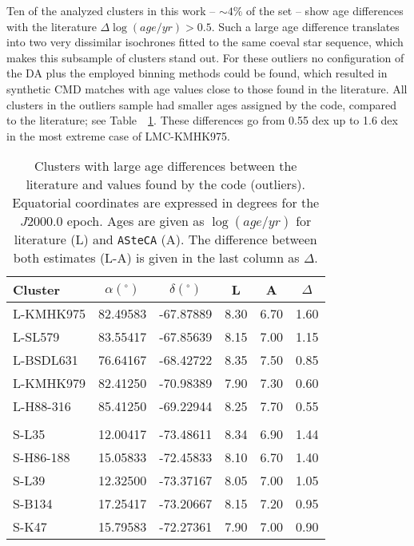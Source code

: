 \documentclass{aa}
\begin{document}
\begin{appendix}
Ten of the analyzed clusters in this work -- ${\sim}4\%$ of the set -- show age
differences with the literature $\Delta\log(age/yr){>}0.5$.
Such a large age difference translates into two very dissimilar isochrones
fitted to the same coeval star sequence, which makes this subsample of
clusters stand out.
%
For these outliers no configuration of the DA plus the employed binning
methods could be found, which resulted in synthetic CMD matches with age values
close to those found in the literature.
%
All clusters in the outliers sample had smaller ages assigned by the code,
compared to the literature; see Table~~\ref{tab:outliers}. These
differences go from 0.55 dex up to 1.6 dex in the most extreme case of
LMC-KMHK975.

\begin{table}
\centering
\caption{Clusters with large age differences between the literature
and values found by the code (outliers).
Equatorial coordinates are expressed in degrees for the $J2000.0$ epoch.
Ages are given as $\log(age/yr)$ for literature (L) and \texttt{ASteCA} (A).
The difference between both estimates (L-A) is given in the last column as
$\Delta$.}
\label{tab:outliers}
\begin{tabular}{lccccc}
\hline\hline
Cluster & $\alpha(^\circ)$ & $\delta(^\circ)$ & L & A & $\Delta$\\
\hline
L-KMHK975 & 82.49583 & -67.87889 & 8.30 & 6.70 & 1.60\\
L-SL579 & 83.55417 & -67.85639 & 8.15 & 7.00 & 1.15\\
L-BSDL631 & 76.64167 & -68.42722 & 8.35 & 7.50 & 0.85\\
L-KMHK979 & 82.41250 & -70.98389 & 7.90 & 7.30 & 0.60\\
L-H88-316 & 85.41250 & -69.22944 & 8.25 & 7.70 & 0.55\\
\\[-1.85ex]
S-L35 & 12.00417 & -73.48611 & 8.34 & 6.90 & 1.44\\
S-H86-188 & 15.05833 & -72.45833 & 8.10 & 6.70 & 1.40\\
S-L39 & 12.32500 & -73.37167 & 8.05 & 7.00 & 1.05\\
S-B134 & 17.25417 & -73.20667 & 8.15 & 7.20 & 0.95\\
S-K47 & 15.79583 & -72.27361 & 7.90 & 7.00 & 0.90\\
\hline
\end{tabular}
\end{table}


\end{appendix}
\end{document}
